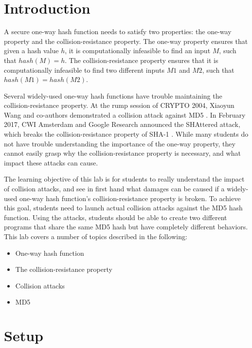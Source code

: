 \documentclass[a4paper]{article}
\begin{document}
\newpage

\section{Introduction \cite{seed-labs}}

A secure one-way hash function needs to satisfy two properties: the one-way property and the collision-resistance property. The one-way property ensures that given a hash value $h$, it is computationally infeasible to find an input $M$, such that $hash(M) = h$. The collision-resistance property ensures that it is computationally infeasible to find two different inputs $M1$ and $M2$, such that $hash(M1) = hash(M2)$.

Several widely-used one-way hash functions have trouble maintaining the collision-resistance property. At the rump session of CRYPTO 2004, Xiaoyun Wang and co-authors demonstrated a collision attack against MD5 \cite{md5-col}. In February 2017, CWI Amsterdam and Google Research announced the SHAttered attack, which breaks the collision-resistance property of SHA-1 \cite{sha-1-col}. While many students do not have trouble understanding the importance of the one-way property, they cannot easily grasp why the collision-resistance property is necessary, and what impact these attacks can cause.

The learning objective of this lab is for students to really understand the impact of collision attacks, and see in first hand what damages can be caused if a widely-used one-way hash function’s collision-resistance property is broken. To achieve this goal, students need to launch actual collision attacks against the MD5 hash function. Using the attacks, students should be able to create two different programs that share the same MD5 hash but have completely different behaviors. This lab covers a number of topics described in the following:

\begin{itemize}
    \item One-way hash function
    \item The collision-resistance property
    \item Collision attacks
    \item MD5
\end{itemize}

\section{Setup}
\end{document}
